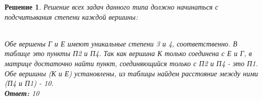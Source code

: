\documentclass[12pt]{article}
\theoremstyle{problem_style}
\newtheorem{solution}{Решение}[subsection]
\begin{document}
\begin{solution}
Решение всех задач данного типа должно начинаться с подсчитывания степени каждой вершины:
\begin{figure}[h]
    \centering
\end{figure}\\
Обе вершены Г и Е имеют уникальные степени 3 и 4, соответственно. В таблице это пункты П2 и П4. Так как вершина К только соединена с Е и Г, в матрице достаточно найти пункт, соединяющийся только с П2 и П4 - это П1.\\
Обе вершины (К и Е) установлены, из таблицы найдем расстояние между ними (П4 и П1) - 10.\\
\textbf{Ответ:} 10
\end{solution}
\break
\end{document}
